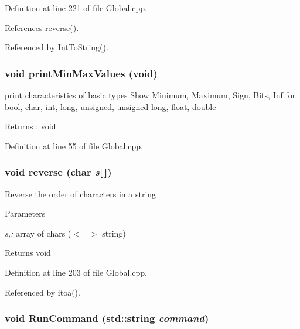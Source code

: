Definition at line 221 of file Global.cpp.



References reverse().



Referenced by IntToString().

\subsubsection[{printMinMaxValues}]{\setlength{\rightskip}{0pt plus 5cm}void printMinMaxValues (void)}\label{Global_8cpp_a1b824bf818f237a2290ee0dcb9a4d1d6}


print characteristics of basic types Show Minimum, Maximum, Sign, Bits, Inf for bool, char, int, long, unsigned, unsigned long, float, double 

\begin{DoxyReturn}{Returns}
: void 
\end{DoxyReturn}


Definition at line 55 of file Global.cpp.

\subsubsection[{reverse}]{\setlength{\rightskip}{0pt plus 5cm}void reverse (char {\em s}\mbox{[}$\,$\mbox{]})}\label{Global_8cpp_aa8a9a8836962d890b4939c112fd29190}
Reverse the order of characters in a string 
\begin{DoxyParams}{Parameters}
\item[{\em s,:}]array of chars ($<$=$>$ string) \end{DoxyParams}
\begin{DoxyReturn}{Returns}
void 
\end{DoxyReturn}


Definition at line 203 of file Global.cpp.



Referenced by itoa().

\subsubsection[{RunCommand}]{\setlength{\rightskip}{0pt plus 5cm}void RunCommand (std::string {\em command})}\label{Global_8cpp_af14ce9adc079d3106f6fe5ed977660a9}


